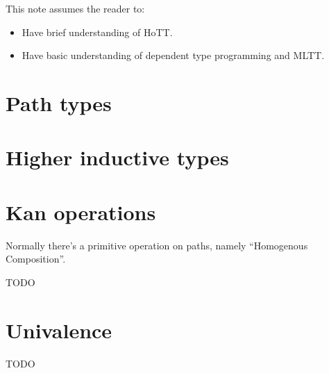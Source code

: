 \documentclass{article}
\newcommand{\TODO}[0]{{\color{red} TODO}}
\begin{document}
This note assumes the reader to:

\begin{itemize}
\item Have brief understanding of HoTT.
\item Have basic understanding of dependent type programming and MLTT.
\end{itemize}

\section{Path types}
\label{sec:path}


\section{Higher inductive types}
\label{sec:hit}


\section{Kan operations}
\label{sec:kan}

Normally there's a primitive operation on paths,
namely ``Homogenous Composition''.

\TODO

\section{Univalence}
\label{sec:ua}

\TODO



\end{document}
